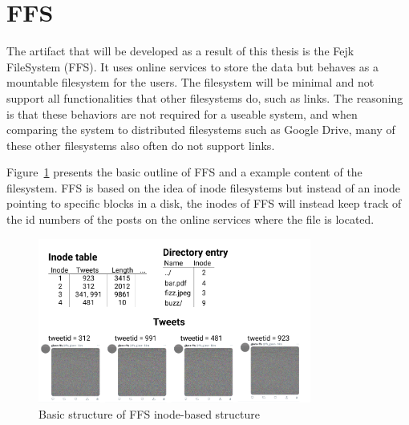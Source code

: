 \section{FFS}
The artifact that will be developed as a result of this thesis is the Fejk FileSystem (FFS). It uses online services to store the data but behaves as a mountable filesystem for the users. The filesystem will be minimal and not support all functionalities that other filesystems do, such as links. The reasoning is that these behaviors are not required for a useable system, and when comparing the system to distributed filesystems such as Google Drive, many of these other filesystems also often do not support links.

Figure~\ref{fig:ffs_inode_diag} presents the basic outline of FFS and a example content of the filesystem. FFS is based on the idea of inode filesystems but instead of an inode pointing to specific blocks in a disk, the inodes of FFS will instead keep track of the id numbers of the posts on the online services where the file is located. 

\begin{figure}[!ht]
	\begin{center}
	  \includegraphics[width=0.8\textwidth]{figures/ffs_inode_diagram.png}
	\end{center}
	\caption{Basic structure of FFS inode-based structure}
	\label{fig:ffs_inode_diag}
\end{figure}

